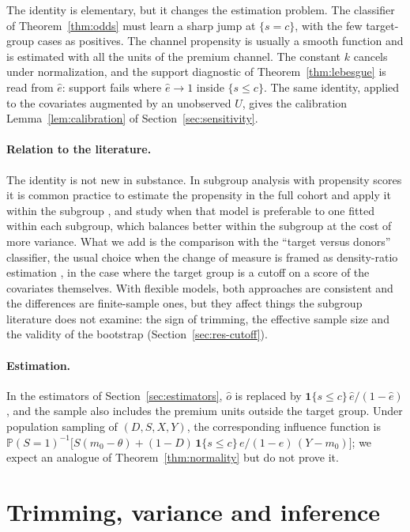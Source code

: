 \documentclass[11pt,a4paper]{article}
\newcommand{\PP}{\mathbb{P}}
\newcommand{\ind}{\mathbf{1}}
\theoremstyle{plain}
\theoremstyle{definition}
\begin{document}
The identity is elementary, but it changes the estimation problem. The classifier of Theorem~\ref{thm:odds} must learn a sharp jump at $\{s=c\}$, with the few target-group cases as positives. The channel propensity is usually a smooth function and is estimated with all the units of the premium channel. The constant $k$ cancels under normalization, and the support diagnostic of Theorem~\ref{thm:lebesgue} is read from $\hat e$: support fails where $\hat e\to1$ inside $\{s\le c\}$. The same identity, applied to the covariates augmented by an unobserved $U$, gives the calibration Lemma~\ref{lem:calibration} of Section~\ref{sec:sensitivity}.

\paragraph{Relation to the literature.} The identity is not new in substance. In subgroup analysis with propensity scores it is common practice to estimate the propensity in the full cohort and apply it within the subgroup \citep{rassen2012}, and \citet{dong2020} study when that model is preferable to one fitted within each subgroup, which balances better within the subgroup at the cost of more variance. What we add is the comparison with the ``target versus donors'' classifier, the usual choice when the change of measure is framed as density-ratio estimation \citep{bickel2009,sugiyama2012}, in the case where the target group is a cutoff on a score of the covariates themselves. With flexible models, both approaches are consistent and the differences are finite-sample ones, but they affect things the subgroup literature does not examine: the sign of trimming, the effective sample size and the validity of the bootstrap (Section~\ref{sec:res-cutoff}).

\paragraph{Estimation.} In the estimators of Section~\ref{sec:estimators}, $\hat o$ is replaced by $\ind\{s\le c\}\,\hat e/(1-\hat e)$, and the sample also includes the premium units outside the target group. Under population sampling of $(D,S,X,Y)$, the corresponding influence function is $\PP(S=1)^{-1}\bigl[S(m_0-\theta)+(1-D)\,\ind\{s\le c\}\,e/(1-e)\,(Y-m_0)\bigr]$; we expect an analogue of Theorem~\ref{thm:normality} but do not prove it.
\section{Trimming, variance and inference}\label{sec:inference}
\end{document}
